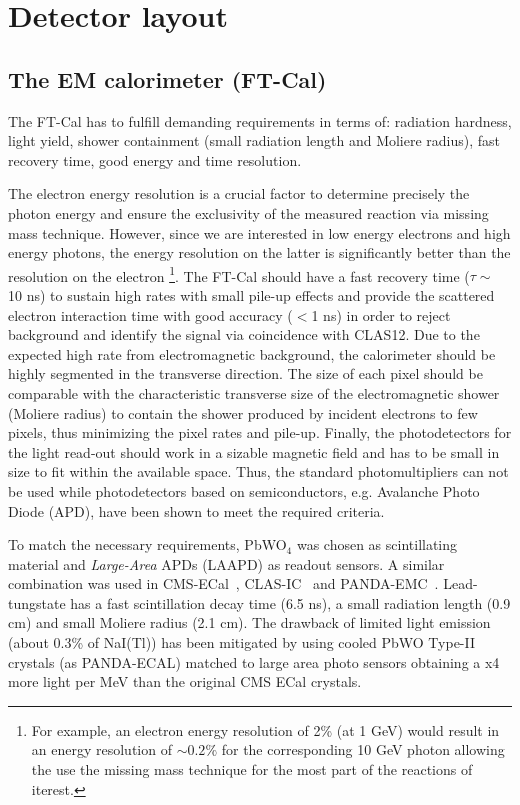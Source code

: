 \section{Detector layout}
\subsection{The EM calorimeter (FT-Cal)}

The FT-Cal has to  fulfill demanding requirements in terms of:  radiation hardness, light yield, shower containment (small radiation length and Moliere radius), fast recovery time, good energy and time resolution.

The electron energy resolution is a crucial factor to determine precisely the photon energy and ensure the exclusivity of the measured reaction via missing mass technique. However, since we are interested in low energy electrons and high energy photons, the energy resolution on the latter is significantly better than the resolution on the electron
\footnote {For example, an electron energy resolution of 2\% (at 1 GeV) would result in an energy resolution of $\sim 0.2 \%$ for the corresponding 10 GeV photon allowing  the use the missing mass technique for the most part of the  reactions of iterest.}.  
The FT-Cal should  have a fast recovery time ($\tau\sim$ 10 ns) to sustain high rates with small pile-up effects and provide the scattered electron interaction time with good accuracy ($<$1 ns) in order to reject background and identify the signal via coincidence with CLAS12. Due to the expected high rate from electromagnetic background, the calorimeter should be highly segmented in the transverse direction. The size of each pixel
should be comparable with the characteristic transverse size of the electromagnetic shower (Moliere radius) to contain the  shower produced  by incident electrons to few pixels, thus minimizing the pixel rates and pile-up. 
Finally, the photodetectors for the light read-out should work  in a sizable magnetic field and has to be small in size to fit within the available space. Thus, the  standard photomultipliers can not be used  while photodetectors based on semiconductors, e.g. Avalanche Photo Diode (APD),   have been shown to meet the required criteria. 

To match the necessary requirements,  PbWO$_4$  was chosen as scintillating material and  {\it Large-Area} APDs (LAAPD) as readout sensors. A similar  combination was used in CMS-ECal~\cite{CMS-ECal}, CLAS-IC~\cite{CLAS-IC} and PANDA-EMC~\cite{PANDA-ECal}. Lead-tungstate has a fast scintillation decay time (6.5 ns), a  small radiation length (0.9 cm) and  small Moliere radius (2.1 cm). The drawback of  limited light emission (about 0.3\% of NaI(Tl)) has been mitigated by using cooled PbWO Type-II crystals (as PANDA-ECAL) matched  to large area photo sensors obtaining a x4 more light per MeV than the original CMS ECal crystals.

